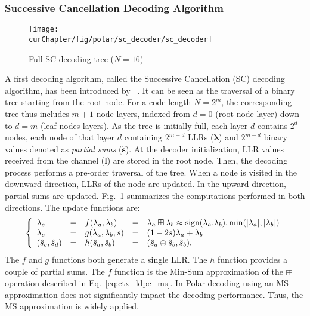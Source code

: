 \subsubsection{Successive Cancellation Decoding Algorithm}

\begin{figure}[htp]
  \centering
  \texttt{[image: \\curChapter/fig/polar/sc\_decoder/sc\_decoder]}
  \caption{Full SC decoding tree ($N = 16$)}
  \label{fig:ctx_polar_sc_decoder}
\end{figure}

A first decoding algorithm, called the Successive Cancellation (SC) decoding
algorithm, has been introduced by \Arikan~\cite{Arikan2009}. It can be seen as
the traversal of a binary tree starting from the root node. For a code length
$N=2^m$, the corresponding tree thus includes $m + 1$ node layers, indexed from
$d=0$ (root node layer) down to $d=m$ (leaf nodes layers). As the tree is
initially full, each layer $d$ contains $2^d$ nodes, each node of that layer $d$
containing $2^{m-d}$ LLRs ($\bm{\lambda}$) and $2^{m-d}$ binary values denoted
as \textit{partial sums} ($\bm{\hat{s}}$). At the decoder initialization, LLR
values received from the channel ($\bm{l}$) are stored in the root node. Then,
the decoding process performs a pre-order traversal of the tree. When a node is
visited in the downward direction, LLRs of the node are updated. In the upward
direction, partial sums are updated. Fig.~\ref{fig:ctx_polar_sc_decoder}
summarizes the computations performed in both directions. The update functions
are:
\begin{eqnarray}
\left\{\begin{array}{l c l c l}
\lambda_c &=& f(\lambda_a,\lambda_b) &=& \lambda_a \boxplus \lambda_b \approx \operatorname*{sign}(\lambda_a.\lambda_b).\min(|\lambda_a|,|\lambda_b|)\\
\lambda_c &=& g(\lambda_a,\lambda_b,s)&=&(1-2s)\lambda_a+\lambda_b\\
(\hat{s}_{c}, \hat{s}_{d}) &=& h(\hat{s}_{a}, \hat{s}_{b}) &=& (\hat{s}_{a} \oplus \hat{s}_{b}, \hat{s}_{b}).
\end{array}\right.
\label{eq:ctx_polar_f_g_h}
\end{eqnarray}
The $f$ and $g$ functions both generate a single LLR. The $h$ function provides
a couple of partial sums. The $f$ function is the Min-Sum approximation of the
$\boxplus$ operation described in Eq.~\ref{eq:ctx_ldpc_ms}. In Polar decoding
using an MS approximation does not significantly impact the decoding
performance. Thus, the MS approximation is widely applied.

